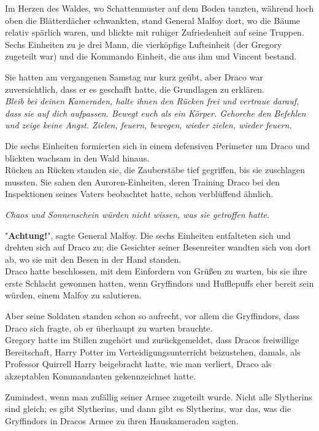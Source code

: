{Im Herzen des Waldes, wo Schattenmuster auf dem Boden tanzten, während hoch oben die Blätterdächer schwankten, stand General Malfoy dort, wo die Bäume relativ spärlich waren, und blickte mit ruhiger Zufriedenheit auf seine Truppen.\\ Sechs Einheiten zu je drei Mann, die vierköpfige Lufteinheit (der Gregory zugeteilt war) und die Kommando Einheit, die aus ihm und Vincent bestand.

Sie hatten am vergangenen Samstag nur kurz geübt, aber Draco war zuversichtlich, dass er es geschafft hatte, die Grundlagen zu erklären.\\ \emph{Bleib bei deinen Kameraden, halte ihnen den Rücken frei und vertraue darauf, dass sie auf dich aufpassen. Bewegt euch als ein Körper. Gehorche den Befehlen und zeige keine Angst. Zielen, feuern, bewegen, wieder zielen, wieder feuern.}

Die sechs Einheiten formierten sich in einem defensiven Perimeter um Draco und blickten wachsam in den Wald hinaus.\\ Rücken an Rücken standen sie, die Zauberstäbe tief gegriffen, bis sie zuschlagen mussten. Sie sahen den Auroren-Einheiten, deren Training Draco bei den Inspektionen seines Vaters beobachtet hatte, schon verblüffend ähnlich.

\emph{Chaos und Sonnenschein würden nicht wissen, was sie getroffen hatte.}

"\textbf{Achtung!}", sagte General Malfoy. Die sechs Einheiten entfalteten sich und drehten sich auf Draco zu; die Gesichter seiner Besenreiter wandten sich von dort ab, wo sie mit den Besen in der Hand standen.\\ Draco hatte beschlossen, mit dem Einfordern von Grüßen zu warten, bis sie ihre erste Schlacht gewonnen hatten, wenn Gryffindors und Hufflepuffs eher bereit sein würden, einem Malfoy zu salutieren.

Aber seine Soldaten standen schon so aufrecht, vor allem die Gryffindors, dass Draco sich fragte, ob er überhaupt zu warten brauchte.\\ Gregory hatte im Stillen zugehört und zurückgemeldet, dass Dracos freiwillige Bereitschaft, Harry Potter im Verteidigungsunterricht beizustehen, damals, als Professor Quirrell Harry beigebracht hatte, wie man verliert, Draco als akzeptablen Kommandanten gekennzeichnet hatte.

Zumindest, wenn man zufällig seiner Armee zugeteilt wurde. Nicht alle Slytherins sind gleich; es gibt Slytherins, und dann gibt es Slytherins, war das, was die Gryffindors in Dracos Armee zu ihren Hauskameraden sagten.

}
